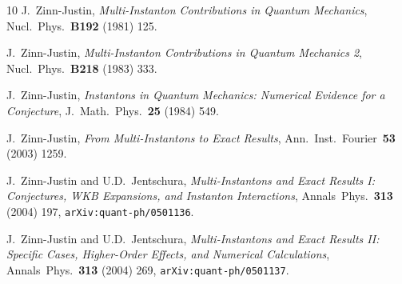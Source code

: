 \documentclass[11pt,a4paper]{article}
\begin{document}
\begin{thebibliography}{10}
J.~Zinn-Justin,
\textit{Multi-Instanton Contributions in Quantum Mechanics},
Nucl.\ Phys.\ \textbf{B192} (1981) 125.

J.~Zinn-Justin,
\textit{Multi-Instanton Contributions in Quantum Mechanics 2},
Nucl.\ Phys.\ \textbf{B218} (1983) 333.

J.~Zinn-Justin,
\textit{Instantons in Quantum Mechanics: Numerical Evidence for a Conjecture},
J.\ Math.\ Phys.\ \textbf{25} (1984) 549.

J.~Zinn-Justin,
\textit{From Multi-Instantons to Exact Results},
Ann.\ Inst.\ Fourier\ \textbf{53} (2003) 1259.

J.~Zinn-Justin and U.D.~Jentschura,
\textit{Multi-Instantons and Exact Results I: Conjectures, WKB Expansions, and Instanton Interactions},
Annals\ Phys.\ \textbf{313} (2004) 197,
\texttt{arXiv:quant-ph/0501136}.

J.~Zinn-Justin and U.D.~Jentschura,
\textit{Multi-Instantons and Exact Results II: Specific Cases, Higher-Order Effects, and Numerical Calculations},
Annals\ Phys.\ \textbf{313} (2004) 269,
\texttt{arXiv:quant-ph/0501137}.

\end{thebibliography}
\end{document}
